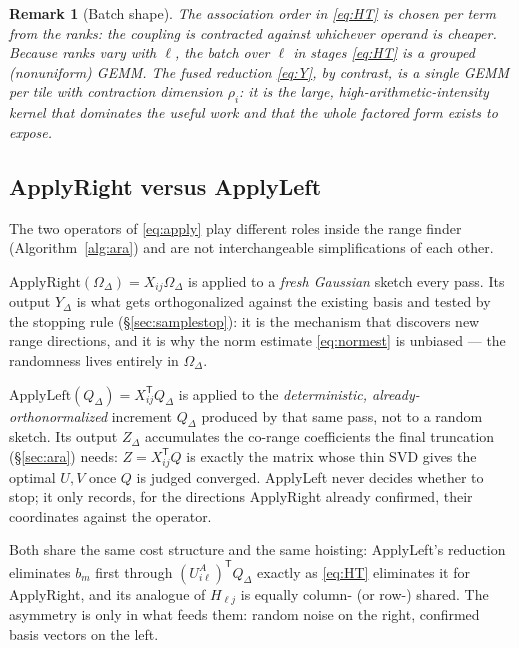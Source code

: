 \documentclass[11pt]{article}
\newtheorem{remark}{Remark}
\newcommand{\T}{\mathsf{T}}
\begin{document}
\begin{remark}[Batch shape]
\label{rem:batch}
The association order in \eqref{eq:HT} is chosen per term from the ranks: the
coupling is contracted against whichever operand is cheaper. Because ranks vary
with $\ell$, the batch over $\ell$ in stages \eqref{eq:HT} is a grouped
(nonuniform) GEMM. The fused reduction \eqref{eq:Y}, by contrast, is a single
GEMM per tile with contraction dimension $\rho_i$: it is the large,
high-arithmetic-intensity kernel that dominates the useful work and that the
whole factored form exists to expose.
\end{remark}

\subsection{ApplyRight versus ApplyLeft}
\label{sec:applyroles}

The two operators of \eqref{eq:apply} play different roles inside the range
finder (Algorithm~\ref{alg:ara}) and are not interchangeable simplifications
of each other.

$\mathrm{ApplyRight}(\Omega_\Delta)=X_{ij}\Omega_\Delta$ is applied to a
\emph{fresh Gaussian} sketch every pass. Its output $Y_\Delta$ is what gets
orthogonalized against the existing basis and tested by the stopping rule
(\S\ref{sec:samplestop}): it is the mechanism that discovers new range
directions, and it is why the norm estimate \eqref{eq:normest} is unbiased
--- the randomness lives entirely in $\Omega_\Delta$.

$\mathrm{ApplyLeft}(Q_\Delta)=X_{ij}^{\T}Q_\Delta$ is applied to the
\emph{deterministic, already-orthonormalized} increment $Q_\Delta$ produced
by that same pass, not to a random sketch. Its output $Z_\Delta$ accumulates
the co-range coefficients the final truncation (\S\ref{sec:ara}) needs:
$Z=X_{ij}^{\T}Q$ is exactly the matrix whose thin SVD gives the optimal
$U,V$ once $Q$ is judged converged. ApplyLeft never decides whether to stop;
it only records, for the directions ApplyRight already confirmed, their
coordinates against the operator.

Both share the same cost structure and the same hoisting: ApplyLeft's
reduction eliminates $b_m$ first through $(U^A_{i\ell})^{\T}Q_\Delta$ exactly
as \eqref{eq:HT} eliminates it for ApplyRight, and its analogue of
$H_{\ell j}$ is equally column- (or row-) shared. The asymmetry is only in
what feeds them: random noise on the right, confirmed basis vectors on the
left.
\end{document}
